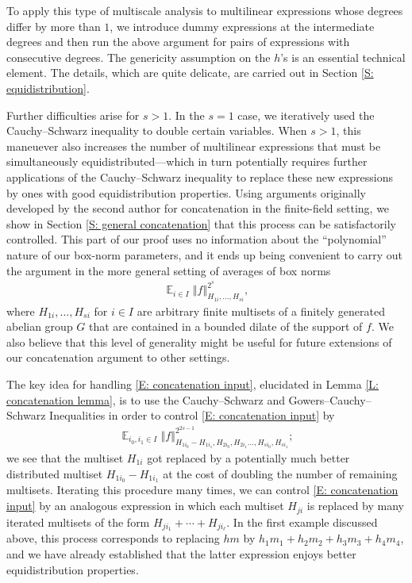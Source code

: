 \documentclass[11pt]{amsart}
\theoremstyle{definition}
\DeclareMathOperator*{\E}{\mathbb{E}}
\newcommand{\norm}[1]{\left\Vert #1\right\Vert}
\begin{document}
To apply this type of multiscale analysis to multilinear expressions whose degrees differ by more than $1$, we introduce dummy expressions at the intermediate degrees and then run the above argument for pairs of expressions with consecutive degrees.  The genericity assumption on the $h$'s is an essential technical element.  The details, which are quite delicate, are carried out in Section \ref{S: equidistribution}.

Further difficulties arise for $s>1$.  In the $s=1$ case, we iteratively used the Cauchy--Schwarz inequality to double certain variables.  When $s>1$, this maneuever also increases the number of multilinear expressions that must be simultaneously equidistributed---which in turn potentially requires further applications of the Cauchy--Schwarz inequality to replace these new expressions by ones with good equidistribution properties.  Using arguments originally developed by the second author \cite{Kuc23} for concatenation in the finite-field setting, we show in Section \ref{S: general concatenation} that this process can be satisfactorily controlled.  This part of our proof uses no information about the ``polynomial'' nature of our box-norm parameters, and it ends up being convenient to carry out the argument in the more general setting of averages of box norms
\begin{align}\label{E: concatenation input}
    \E_{i\in I}\norm{f}_{H_{1i}, \ldots, H_{si}}^{2^s},
\end{align}
where $H_{1i}, \ldots, H_{si}$ for $i \in I$ are arbitrary finite multisets of a finitely generated abelian group $G$ that are contained in a bounded dilate of the support of $f$.  We also believe that this level of generality might be useful for future extensions of our concatenation argument to other settings. 

The key idea for handling \eqref{E: concatenation input}, elucidated in Lemma \ref{L: concatenation lemma}, is to use the Cauchy--Schwarz and Gowers--Cauchy--Schwarz Inequalities in order to control \eqref{E: concatenation input} by
\begin{align*}
    \E_{i_0, i_1\in I}\norm{f}_{H_{1i_0}-H_{1i_1}, H_{2i_0}, H_{2i_1} \ldots, H_{si_0}, H_{si_1}}^{2^{2s-1}};
\end{align*}
we see that the multiset $H_{1i}$ got replaced by a potentially much better distributed multiset $H_{1i_0}-H_{1i_1}$ at the cost of doubling the number of remaining multisets. Iterating this procedure many times, we can control \eqref{E: concatenation input} by an analogous expression in which each multiset $H_{ji}$ is replaced by many iterated multisets of the form $H_{ji_1} + \cdots + H_{ji_\ell}$. In the first example discussed above, this process corresponds to replacing $hm$ by $h_1m_1+h_2m_2+h_3m_3+h_4m_4$, and we have already established that the latter expression enjoys better equidistribution properties.
\end{document}
